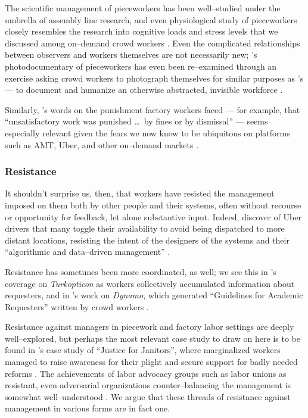 \documentclass[trackingWork]{subfiles}
\begin{document}
{\begin{appendices}
    The scientific management of pieceworkers has been well--studied under the umbrella of assembly line research,
    and even physiological study of pieceworkers closely resembles the
    research into cognitive loads and stress levels that we discussed among on--demand crowd workers
    \cite{hu1961parallel,pieceworkBiologicalHarm}.
    Even the complicated relationships between observers and workers themselves are not necessarily new;
    \citeauthor{riisOtherSideLives}'s photodocumentary of pieceworkers has even been re--examined through an exercise asking crowd workers
    to photograph themselves for similar purposes as \citeauthor{riisOtherSideLives}'s --- to document and humanize an otherwise abstracted, invisible workforce
    \cite{facesOfMechanicalTurk,turkopticon,riisOtherSideLives}.

    Similarly, \citeauthor{pollard1963factory}'s words on the punishment factory workers faced ---
    for example, that ``unsatisfactory work was punished \dots~by fines or by dismissal'' ---
    seems especially relevant given the fears we now know to be ubiquitous on platforms such as AMT, Uber, and other on--demand markets
    \cite{pollard1963factory,uberAlgorithm,dynamo,turkopticon,takingAHITMcInnis}.

    \subsubsection{Resistance}
    It shouldn't surprise us, then, that workers have resisted the management imposed on them both by other people and their systems,
    often without recourse or opportunity for feedback, let alone substantive input.
    Indeed, \citeauthor{uberAlgorithm} discover of Uber drivers that 
    many toggle their availability to avoid being dispatched to more distant locations,
    resisting the intent of the designers of the systems and their ``algorithmic and data--driven management''
    \cite{uberAlgorithm}.

    Resistance has sometimes been more coordinated, as well;
    we see this in \citeauthor{turkopticon}'s coverage on \textit{Turkopticon} as workers collectively accumulated information about requesters, and
    in \citeauthor{dynamo}'s work on \textit{Dynamo}, which generated ``Guidelines for Academic Requesters'' written by crowd workers
    \cite{turkopticon,dynamo}.

    Resistance against managers in piecework and factory labor settings are deeply well--explored,
    but perhaps the most relevant case study to draw on here is to be found in
    \citeauthor{waldinger1996helots}'s case study of ``Justice for Janitors'',
    where marginalized workers managed to raise awareness for their plight and secure support for badly needed reforms
    \cite{waldinger1996helots}.
    The achievements of labor advocacy groups such as labor unions as resistant,
    even adversarial organizations counter--balancing the management
    is somewhat well--understood
    \cite{russell1982collective,craig1992behavior}.
    We argue that these threads of resistance against management in various forms
    are in fact one.


  \end{appendices}
  }
\end{document}
